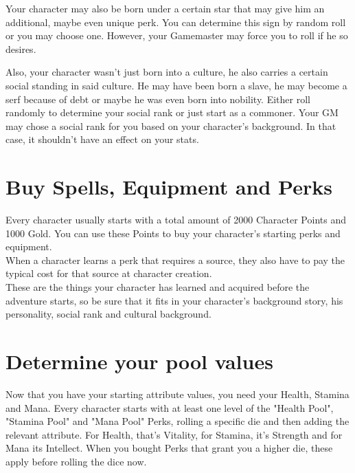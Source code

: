 Your character may also be born under a certain star that may give him an additional, maybe even unique perk. You can determine this sign by random roll or you may choose one. However, your Gamemaster may force you to roll if he so desires.

Also, your character wasn’t just born into a culture, he also carries a certain social standing in said culture. He may have been born a slave, he may become a serf because of debt or maybe he was even born into nobility. Either roll randomly to determine your social rank or just start as a commoner. Your GM may chose a social rank for you based on your character's background. In that case, it shouldn't have an effect on your stats.



\section{Buy Spells, Equipment and Perks}

Every character usually starts with a total amount of 2000 Character Points and 1000 Gold. You can use these Points to buy your character’s starting perks and equipment.\\
When a character learns a perk that requires a source, they also have to pay the typical cost for that source at character creation.\\
These are the things your character has learned and acquired before the adventure starts, so be sure that it fits in your character’s background story, his personality, social rank and cultural background.\\




\section{Determine your pool values}

Now that you have your starting attribute values, you need your Health, Stamina and Mana. Every character starts with at least one level of the "Health Pool", "Stamina Pool" and "Mana Pool" Perks, rolling a specific die and then adding the relevant attribute. For Health, that’s Vitality, for Stamina, it’s Strength and for Mana its Intellect. When you bought Perks that grant you a higher die, these apply before rolling the dice now.